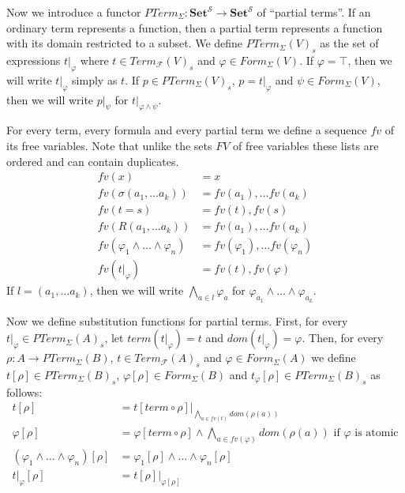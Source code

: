 \documentclass{amsart}
\theoremstyle{definition}
\theoremstyle{remark}
\newcommand{\cat}[1]{\mathbf{#1}}
\newcommand{\Set}{\cat{Set}}
\numberwithin{figure}{section}
\begin{document}
Now we introduce a functor $PTerm_\Sigma : \Set^\mathcal{S} \to \Set^\mathcal{S}$ of ``partial terms''.
If an ordinary term represents a function, then a partial term represents a function with its domain restricted to a subset.
We define $PTerm_\Sigma(V)_s$ as the set of expressions $t|_\varphi$ where $t \in Term_\mathcal{F}(V)_s$ and $\varphi \in Form_\Sigma(V)$.
If $\varphi = \top$, then we will write $t|_\varphi$ simply as $t$.
If $p \in PTerm_\Sigma(V)_s$, $p = t|_\varphi$ and $\psi \in Form_\Sigma(V)$, then we will write $p|_\psi$ for $t|_{\varphi \land \psi}$.

For every term, every formula and every partial term we define a sequence $fv$ of its free variables.
Note that unlike the sets $FV$ of free variables these lists are ordered and can contain duplicates.
\begin{align*}
fv(x) & = x \\
fv(\sigma(a_1, \ldots a_k)) & = fv(a_1), \ldots fv(a_k) \\
fv(t = s) & = fv(t), fv(s) \\
fv(R(a_1, \ldots a_k)) & = fv(a_1), \ldots fv(a_k) \\
fv(\varphi_1 \land \ldots \land \varphi_n) & = fv(\varphi_1), \ldots fv(\varphi_n) \\
fv(t|_\varphi) & = fv(t), fv(\varphi)
\end{align*}
If $l = (a_1, \ldots a_k)$, then we will write $\bigwedge_{a \in l} \varphi_a$ for $\varphi_{a_1} \land \ldots \land \varphi_{a_k}$.

Now we define substitution functions for partial terms.
First, for every $t|_\varphi \in PTerm_\Sigma(A)_s$, let $term(t|_\varphi) = t$ and $dom(t|_\varphi) = \varphi$.
Then, for every $\rho : A \to PTerm_\Sigma(B)$, $t \in Term_\mathcal{F}(A)_s$ and $\varphi \in Form_\Sigma(A)$
we define $t[\rho] \in PTerm_\Sigma(B)_s$, $\varphi[\rho] \in Form_\Sigma(B)$ and $t_\varphi[\rho] \in PTerm_\Sigma(B)_s$ as follows:
\begin{align*}
t[\rho] & = t[term \circ \rho]|_{\bigwedge_{a \in fv(t)} dom(\rho(a))} \\
\varphi[\rho] & = \varphi[term \circ \rho] \land \bigwedge_{a \in fv(\varphi)} dom(\rho(a)) \text{ if $\varphi$ is atomic} \\
(\varphi_1 \land \ldots \land \varphi_n)[\rho] & = \varphi_1[\rho] \land \ldots \land \varphi_n[\rho] \\
t|_\varphi[\rho] & = t[\rho]|_{\varphi[\rho]}
\end{align*}
\end{document}
